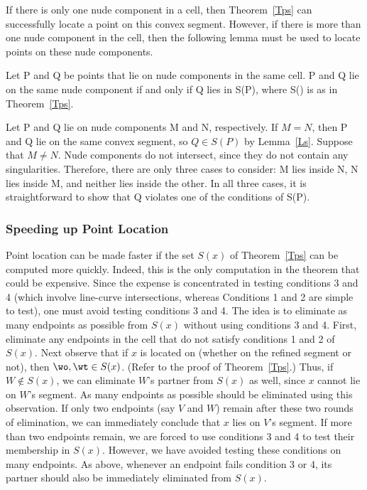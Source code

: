 \vspace{.2in}

If there is only one nude component in a cell, then Theorem~\ref{Tps} 
can successfully locate a point on this convex segment.
However, if there is more than one nude component in the cell, then the following
lemma must be used to locate points on these nude components.

\begin{lemma}
\label{Ln}
Let P and Q be points that lie on nude components in the same cell.
P and Q lie on the same nude component if and only if 
Q lies in S(P), where S() is as in Theorem~\ref{Tps}.
\end{lemma}
Let P and Q lie on nude components M and N, respectively.
If $M=N$, then P and Q lie on the same convex segment, so $Q \in S(P)$ by
Lemma~\ref{Ls}.
Suppose that $M \neq N$.
Nude components do not intersect, since they do not contain any singularities.
Therefore, there are only three cases to consider: M lies inside N, N lies 
inside M, and neither lies inside the other.
In all three cases, it is straightforward to show that Q violates one of the conditions
of S(P).
\QED

\subsubsection{Speeding up Point Location}
\label{ss-speeeeed}

Point location can be made faster if the set $S(x)$ of Theorem~\ref{Tps} can be
computed more quickly.
Indeed, this is the only computation in the theorem that could be expensive.
Since the expense is concentrated in testing conditions 3 and 4 (which involve
line-curve intersections, whereas Conditions 1 and 2 are simple to test),
one must avoid testing conditions 3 and 4.
The idea is to eliminate as many endpoints as possible from $S(x)$ without using
conditions 3 and 4.
First, eliminate any endpoints in the cell that do not satisfy conditions 1 and 2 of $S(x)$.
Next observe that if $x$ is located on \arc{\wo\wt}
(whether on the refined segment or not), then $\wo,\wt \in S(x)$.
(Refer to the proof of Theorem~\ref{Tps}.)
Thus, if $W \not\in S(x)$, we can eliminate $W$'s partner from $S(x)$ as well,
since $x$ cannot lie on $W$'s segment.
As many endpoints as possible should be eliminated using this observation.
If only two endpoints (say $V$ and $W$) remain after these two rounds of elimination,
we can immediately conclude that $x$ lies on $V$'s segment.
If more than two endpoints remain, we are forced to use conditions 3 and 4 to test
their membership in $S(x)$.
However, we have avoided testing these conditions on many endpoints.
As above, whenever an endpoint fails condition 3 or 4, its partner should also be
immediately eliminated from $S(x)$.

